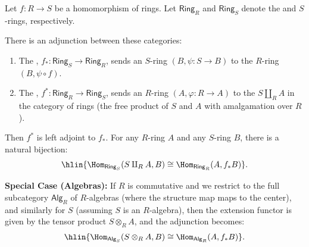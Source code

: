 






\begin{theorem}
    \TODO{}
Let $f: R \to S$ be a homomorphism of rings.
Let $\mathsf{Ring}_R$ and $\mathsf{Ring}_S$ denote the  and $S$-rings, respectively.

There is an adjunction between these categories:
\begin{enumerate}
    \item The , $f_*: \mathsf{Ring}_S \to \mathsf{Ring}_R$, sends an $S$-ring $(B, \psi: S \to B)$ to the $R$-ring $(B, \psi \circ f)$.
    \item The , $f^*: \mathsf{Ring}_R \to \mathsf{Ring}_S$, sends an $R$-ring $(A, \varphi: R \to A)$ to the  $S \amalg_R A$ in the category of rings (the free product of $S$ and $A$ with amalgamation over $R$).
\end{enumerate}

Then $f^*$ is left adjoint to $f_*$. For any $R$-ring $A$ and any $S$-ring $B$, there is a natural bijection:
\[
    \hlin{ \Hom_{\mathsf{Ring}_S}(S \amalg_R A, B) \cong \Hom_{\mathsf{Ring}_R}(A, f_*B) }.
\]

\textbf{Special Case (Algebras):}
If $R$ is commutative and we restrict to the full subcategory $\mathsf{Alg}_R$ of $R$-algebras (where the structure map maps to the center), and similarly for $S$ (assuming $S$ is an $R$-algebra), then the extension functor is given by the tensor product $S \otimes_R A$, and the adjunction becomes:
\[
    \hlin{ \Hom_{\mathsf{Alg}_S}(S \otimes_R A, B) \cong \Hom_{\mathsf{Alg}_R}(A, f_*B) }.
\]
\end{theorem}












